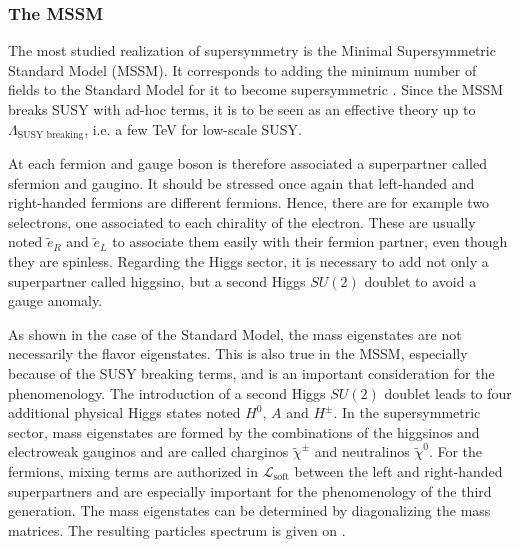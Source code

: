         \subsubsection{The MSSM}

        The most studied realization of supersymmetry is the Minimal Supersymmetric Standard
        Model (MSSM). It corresponds to adding the minimum number of fields to the Standard
        Model for it to become supersymmetric \cite{Dawson, Vempati, Romao}.
        Since the MSSM breaks SUSY with ad-hoc terms, it is to be seen as an effective
        theory up to $\Lambda_{\text{SUSY breaking}}$, i.e. a few TeV for low-scale SUSY.

        At each fermion and gauge boson is therefore associated a superpartner called
        sfermion and gaugino. It should be
        stressed once again that left-handed and right-handed fermions are different
        fermions. Hence, there are for example two selectrons, one associated to
        each chirality of the electron. These are usually noted $\tilde{e}_R$ and $\tilde{e}_L$
        to associate them easily with their fermion partner, even though they are spinless.
        Regarding the Higgs sector, it is necessary to add not only a superpartner called
        higgsino, but a second Higgs $SU(2)$ doublet to avoid a gauge anomaly.

        As shown in the case of the Standard Model, the mass eigenstates are not
        necessarily the flavor eigenstates. This is also true in the MSSM, especially
        because of the SUSY breaking terms, and is an important consideration for the
        phenomenology. The introduction of a second Higgs $SU(2)$ doublet leads to four
        additional physical Higgs states noted $H^0$, $A$ and $H^\pm$.
        In the supersymmetric sector, mass eigenstates are formed by the combinations of
        the higgsinos and electroweak gauginos and are called charginos $\tilde{\chi}^\pm$
        and neutralinos $\tilde{\chi}^0$.
        For the fermions, mixing terms are authorized in $\mathcal{L}_\text{soft}$ between
        the left and right-handed superpartners and are especially important for the
        phenomenology of the third generation. The mass eigenstates can be determined
        by diagonalizing the mass matrices. The resulting particles spectrum is given on
        .

